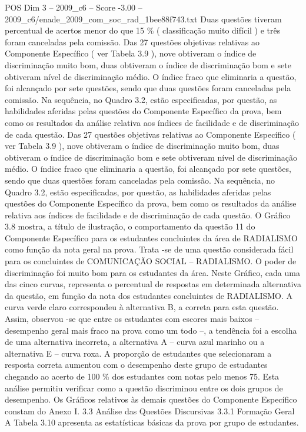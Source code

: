 \begin{textsample}{POS Dim 3 – 2009\_c6 – Score -3.00 – 2009\_c6/enade\_2009\_com\_soc\_rad\_1bee88f743.txt}
Duas questões tiveram percentual de acertos menor do que 15 \% ( classificação muito difícil ) e três foram canceladas pela comissão.
Das 27 questões objetivas relativas ao Componente Específico ( ver Tabela 3.9 ), nove obtiveram o índice de discriminação muito bom, duas obtiveram o índice de discriminação bom e sete obtiveram nível de discriminação médio.
O índice fraco que eliminaria a questão, foi alcançado por sete questões, sendo que duas questões foram canceladas pela comissão.
Na sequência, no Quadro 3.2, estão especificadas, por questão, as habilidades aferidas pelas questões do Componente Específico da prova, bem como os resultados da análise relativa aos índices de facilidade e de discriminação de cada questão.
Das 27 questões objetivas relativas ao Componente Específico ( ver Tabela 3.9 ), nove obtiveram o índice de discriminação muito bom, duas obtiveram o índice de discriminação bom e sete obtiveram nível de discriminação médio.
O índice fraco que eliminaria a questão, foi alcançado por sete questões, sendo que duas questões foram canceladas pela comissão.
Na sequência, no Quadro 3.2, estão especificadas, por questão, as habilidades aferidas pelas questões do Componente Específico da prova, bem como os resultados da análise relativa aos índices de facilidade e de discriminação de cada questão.
O Gráfico 3.8 mostra, a título de ilustração, o comportamento da questão 11 do Componente Específico para os estudantes concluintes da área de RADIALISMO como função da nota geral na prova.
Trata -se de uma questão considerada fácil para os concluintes de COMUNICAÇÃO SOCIAL – RADIALISMO.
O poder de discriminação foi muito bom para os estudantes da área.
Neste Gráfico, cada uma das cinco curvas, representa o percentual de respostas em determinada alternativa da questão, em função da nota dos estudantes concluintes de RADIALISMO.
A curva verde claro correspondeu à alternativa B, a correta para esta questão.
Assim, observou -se que entre os estudantes com escores mais baixos – desempenho geral mais fraco na prova como um todo –, a tendência foi a escolha de uma alternativa incorreta, a alternativa A – curva azul marinho ou a alternativa E – curva roxa.
A proporção de estudantes que selecionaram a resposta correta aumentou com o desempenho deste grupo de estudantes chegando ao acerto de 100 \% dos estudantes com notas pelo menos 75.
Esta análise permitiu verificar como a questão discriminou entre os dois grupos de desempenho.
Os Gráficos relativos às demais questões do Componente Específico constam do Anexo I. 3.3 Análise das Questões Discursivas 3.3.1 Formação Geral A Tabela 3.10 apresenta as estatísticas básicas da prova por grupo de estudantes.

\end{textsample}
